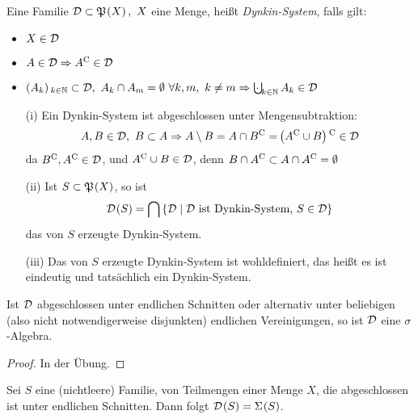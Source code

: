 \documentclass[skript.tex]{\mf{P}s}
\begin{document}
	\begin{defin}
		Eine Familie $\mc{D} \subset \mf{P}\pr{X},\ X$ eine Menge, heißt \textit{Dynkin-System}, falls gilt:
		\begin{itemize}
			\item $X \in \mathcal{D}$
			\item $A \in \mathcal{D} \Rightarrow A^\mathrm{C} \in \mathcal{D}$
			\item $\pr{A_k}_{k\in\mathbb{N}} \subset \mc{D},\ A_k \cap A_m = \emptyset\ \forall k,m,\ k\neq m \Rightarrow \bigcupdot_{k\in\mathbb{N}} A_k \in \mc{D}$
		\end{itemize}  
	\end{defin}
	
	\begin{bem}
		\hfill
		\begin{itemize}
			\item[(i)] Ein Dynkin-System ist abgeschlossen unter Mengensubtraktion:
				\begin{equation*}
					A,B \in \mc{D},\ B\sbs A \Ra A\sm B = A\cap \cp{B}= \cp{\pr{\cp{A} \cup B}} \in \D
				\end{equation*}
				da $ B^\mathrm{C},A^\mathrm{C}\in \mathcal{D}$, und $ A^\mathrm{C}\cup B \in \mathcal{D}$, denn  $B\cap A^\mathrm{C} \subset A\cap A^\mathrm{C} = \emptyset$ 
			
			\item[(ii)] Ist $S\sbs \mf{P}\pr{X}$, so ist
				\begin{equation*}
					\D\pr{S} = \bigcap \cbr{\D \mid \D \text{  ist Dynkin-System, } S\in \D}
				\end{equation*}
				das \textup{von $S$ erzeugte Dynkin-System}.
				
			\item[(iii)] Das von $S$ erzeugte Dynkin-System ist wohldefiniert, das heißt es ist eindeutig und tatsächlich ein Dynkin-System.
		\end{itemize}
	\end{bem}

	\begin{lem}
		Ist $\mathcal{D}$ abgeschlossen unter endlichen Schnitten oder alternativ unter beliebigen (also nicht notwendigerweise disjunkten) endlichen Vereinigungen, so ist $\mathcal{D}$ eine $\sigma$-Algebra.
	\end{lem}
	
	\begin{proof}
		In der Übung.
	\end{proof}
	
	\begin{lem}
		Sei $S$ eine (nichtleere) Familie, von Teilmengen einer Menge $X$, die abgeschlossen ist unter endlichen Schnitten. Dann folgt $\D\pr{S} = \Sigma\pr{S}$.
	\end{lem}
\end{document}
